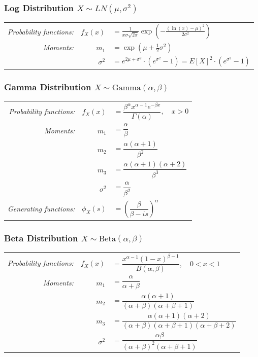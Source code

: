 \documentclass[11pt,a4paper]{article}
\theoremstyle{definition}
\begin{document}
\subsubsection*{Log Distribution $X \sim LN(\mu,\sigma^2)$}
\begin{longtable}{r r l}
\textit{Probability functions:} & $f_X(x)$ & $\displaystyle = \frac{1}{x\sigma\sqrt{2\pi}} \exp\left(-\frac{(\ln(x)-\mu)^2}{2\sigma^2}\right)$ \vspace{0.1cm}\\
\textit{Moments:} & $m_1$ & $=\exp(\mu + \frac{1}{2} \sigma^2)$\\
& $\sigma^2$ & $= e^{2\mu + \sigma^2} \cdot (e^{\sigma^2}-1) = E[X]^2 \cdot (e^{\sigma^2} -1 )$\\
\end{longtable}
\subsubsection*{Gamma Distribution $X \sim \text{Gamma}(\alpha,\beta)$}
{\renewcommand{\arraystretch}{1.6}
\begin{longtable}{r r l}
\textit{Probability functions:} & $f_X(x)$ & $=\dfrac{\beta^\alpha x^{\alpha-1}e^{-\beta x}}{\Gamma(\alpha)}, \quad x>0$\\
\textit{Moments:} & $m_1$ & $=\dfrac{\alpha}{\beta}$\\
& $m_2$ & $=\dfrac{\alpha(\alpha+1)}{\beta^2}$\\
& $m_3$ & $=\dfrac{\alpha(\alpha+1)(\alpha+2)}{\beta^3}$\\
& $\sigma^2$ & $=\dfrac{\alpha}{\beta^2}$\\
\textit{Generating functions:}
& $\phi_X(s)$ & $=\left(\dfrac{\beta}{\beta-is}\right)^\alpha$\\
\end{longtable}
}

\subsubsection*{Beta Distribution $X \sim \text{Beta}(\alpha,\beta)$}
{\renewcommand{\arraystretch}{1.8}
\begin{longtable}{r r l}
\textit{Probability functions:} & $f_X(x)$ & $=\dfrac{x^{\alpha-1}(1-x)^{\beta-1}}{B(\alpha,\beta)}, \quad 0<x<1$\\
\textit{Moments:} & $m_1$ & $=\dfrac{\alpha}{\alpha+\beta}$\\
& $m_2$ & $=\dfrac{\alpha(\alpha+1)}{(\alpha+\beta)(\alpha+\beta+1)}$\\
& $m_3$ & $=\dfrac{\alpha(\alpha+1)(\alpha+2)}{(\alpha+\beta)(\alpha+\beta+1)(\alpha+\beta+2)}$\\
& $\sigma^2$ & $=\dfrac{\alpha\beta}{(\alpha+\beta)^2(\alpha+\beta+1)}$\\
\end{longtable}
}
\end{document}
